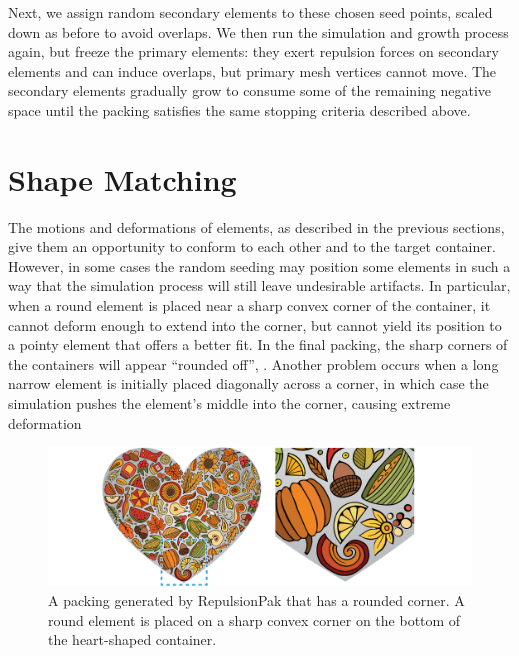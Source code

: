 Next, we assign random secondary elements to these chosen seed
points, scaled down as before to avoid overlaps.  We then run the
simulation and growth process again, but freeze the primary elements:
they exert repulsion forces on secondary elements and can induce
overlaps, but primary mesh vertices cannot move.  The secondary
elements gradually grow to consume some of the remaining negative
space until the packing satisfies the same stopping criteria
described above.



\section{Shape Matching}
\label{repulsionpak_shape_matching}


The motions and deformations of elements, as described
in the previous sections, give them an opportunity to conform to each 
other and to the target container.  However, in some cases the random 
seeding may position some elements in such a way that the simulation 
process will still leave undesirable artifacts.  In particular, when
a round element is placed near a sharp convex corner of the container,
it cannot deform enough to extend into the corner, but cannot yield its
position to a pointy element that offers a better fit.  In the final
packing, the sharp corners of the containers will appear ``rounded off'', .
Another problem occurs when a long narrow element is initially placed diagonally across a corner, 
in which case the simulation pushes the element's middle into the corner, causing extreme deformation

\begin{figure}  %
\centering
\includegraphics[width=1.0\textwidth]{figures/repulsionpak/rounded.pdf}
\caption[A round element is placed near a sharp convex corner of the container]{
  \label{fig_round}
  \newtext
  {
  A packing generated by RepulsionPak that has a rounded corner.
  A round element is placed on a sharp convex corner on the bottom of the heart-shaped container.
  }
}
\end{figure}

